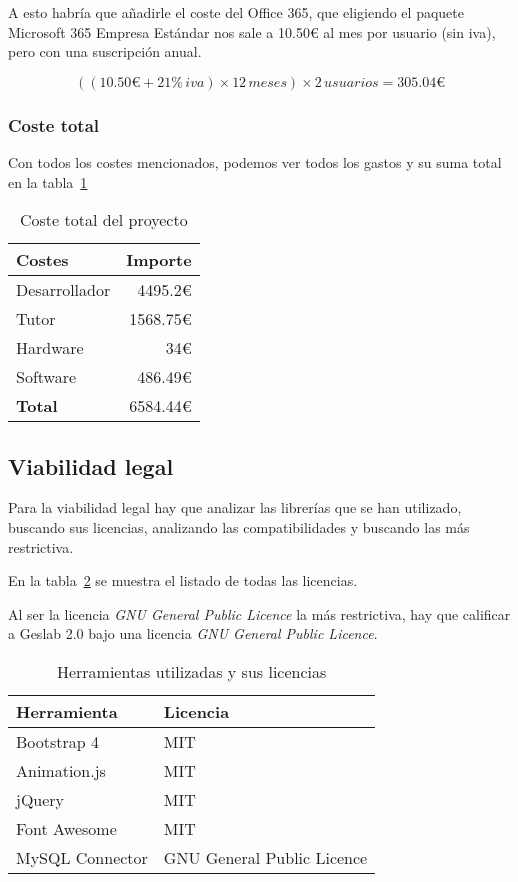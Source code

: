 A esto habría que añadirle el coste del Office 365, que eligiendo el paquete Microsoft 365 Empresa Estándar nos sale a 10.50€ al mes por usuario (sin iva), pero con una suscripción anual.

\[ ((10.50 \euro + 21\% \, iva) \times 12\, meses) \times 2\, usuarios = 305.04 \euro\]

\subsubsection{Coste total}

Con todos los costes mencionados, podemos ver todos los gastos y su suma total en la tabla~\ref{tabla:costes}

\begin{table}[h]
	\centering
	\caption{Coste total del proyecto}
	\label{tabla:costes}
	\begin{tabular}{p{6cm} r}
		\toprule
		Costes & Importe \\ \midrule
		Desarrollador			     & 4495.2\euro   						\\
		Tutor  				         & 1568.75\euro							\\
		Hardware				     & 34\euro								\\
		Software 				     & 486.49\euro 							\\
		\textbf{Total} 			     & 6584.44\euro 						\\  
		\bottomrule
	\end{tabular}
\end{table}


\subsection{Viabilidad legal}
 Para la viabilidad legal hay que analizar las librerías que se han utilizado, buscando sus licencias, analizando las compatibilidades y buscando las más restrictiva.
 
En la tabla~\ref{tabla:licencias} se muestra el listado de todas las licencias.

Al ser la licencia \textit{GNU General Public Licence} la más restrictiva, hay que calificar a Geslab 2.0 bajo una licencia \textit{GNU General Public Licence}.

\begin{table}[h]
	\centering
	\caption{Herramientas utilizadas y sus licencias}
	\label{tabla:licencias}
	\begin{tabular}{p{4cm} p{6cm}}
		\toprule
		Herramienta & Licencia \\ \midrule
		Bootstrap 4				     & MIT   								\\
		Animation.js		         & MIT   								\\
		jQuery				         & MIT   								\\
		Font Awesome			     & MIT 									\\ 
		MySQL Connector				 & GNU General Public Licence			\\ \bottomrule
	\end{tabular}
\end{table}



